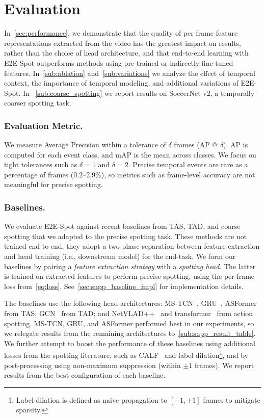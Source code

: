 \documentclass[runningheads]{llncs}
\newcommand{\notation}[1]{\ensuremath{#1}\xspace}
\newcommand{\OURMETHOD}{{E2E-Spot}\xspace}
\newcommand{\soccernet}{{SoccerNet-v2}\xspace}
\newcommand{\Tolerance}{\notation{\delta}}
\begin{document}
\section{Evaluation}
\label{sec:result}

In~\autoref{sec:performance}, we demonstrate that the quality of per-frame feature representations extracted from the video has the
greatest impact on results, rather than the choice of head architecture, and that end-to-end learning with \OURMETHOD outperforms methods using pre-trained or indirectly fine-tuned features.
In~\autoref{sub:ablation} and~\autoref{sub:variations} we analyze the effect of temporal context, the importance of temporal modeling, and additional variations of \OURMETHOD.
In ~\autoref{sub:coarse_spotting} we report results on \soccernet, a temporally coarser spotting task.

\subsubsection*{Evaluation Metric.}
We measure Average Precision within a tolerance of \Tolerance frames (AP @ \Tolerance).
AP is computed for each event class, and mAP is the mean across classes.
We focus on tight tolerances such as $\Tolerance=1$ and $\Tolerance=2$.
Precise temporal events are rare as a percentage of frames (0.2--2.9\%), so
metrics such as frame-level accuracy are not meaningful for precise spotting.

\subsubsection*{Baselines.}
We evaluate \OURMETHOD against recent baselines from TAS, TAD, and coarse spotting that we adapted to the precise spotting task.
These methods are not trained end-to-end;
they adopt a two-phase separation between feature extraction and head training (i.e., downstream model) for the end-task.
We form our baselines by pairing a \emph{feature extraction strategy} with a \emph{spotting head}. The latter is trained on extracted features
to perform precise spotting, using the per-frame loss from~\autoref{eq:loss}.
See~\autoref{sec:supp_baseline_impl} for implementation details.

The baselines use the following head architectures: MS-TCN~\cite{mstcn}, GRU~\cite{gatedrnn}, ASFormer~\cite{asformer} from TAS; GCN~\cite{gtad} from TAD; and NetVLAD++~\cite{netvladpp} and transformer~\cite{featurecombattention} from action spotting.
MS-TCN, GRU, and ASFormer performed best in our experiments, so we relegate results from the remaining architectures to~\autoref{sub:supp_result_table}.
We further attempt to boost the performance of these baselines using additional losses from the spotting literature, such as CALF~\cite{calf} and label dilation\footnote{Label dilation is defined as naive propagation to $[-1,+1]$ frames to mitigate sparsity.}, and by post-processing using non-maximum suppression (within $\pm1$ frames).
We report results from the best configuration of each baseline.
\end{document}
